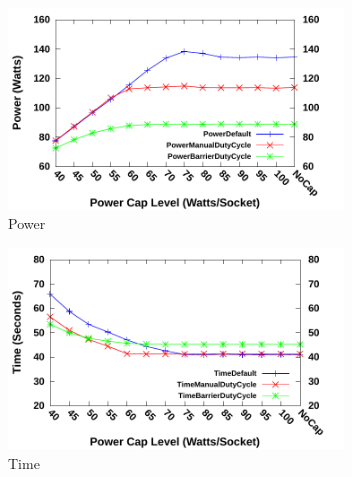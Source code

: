 \begin{figure}[bt]
    \includegraphics[width=3.5in]{fake2-power.pdf}
    \caption{Power }
    \label{fig:Unbalanced-fake2}
\end{figure}
\begin{figure}[bt]
    \includegraphics[width=3.5in]{fake2-time.pdf}
    \caption{Time}
    \label{fig:UnbalancedTime-fake2}
\end{figure}


